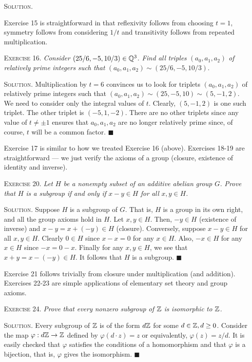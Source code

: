 \documentclass[11pt, leqno]{article}
\newcommand{\done}{\ensuremath{\blacksquare}}
\begin{document}
\textsc{Solution}.

Exercise 15 is straightforward in that reflexivity follows from choosing $t=1$, symmetry follows from considering $1/t$ and transitivity follows from repeated multiplication.

\textsc{Exercise 16}. \emph{Consider $(25/6, -5, 10/3) \in \mathbb{Q}^3$. Find all triples $(a_0,a_1,a_2)$ of relatively prime integers such that $(a_0,a_1,a_2)\sim (25/6, -5, 10/3)$}.

\textsc{Solution}. Multiplication by $t=6$ convinces us to look for triplets $(a_0,a_1,a_2)$ of relatively prime integers such that $(a_0,a_1,a_2)\sim (25, -5, 10)\sim (5, -1, 2)$. We need to consider only the integral values of $t$. Clearly, $(5, -1, 2)$ is one such triplet. The other triplet is $(-5, 1, -2)$. There are no other triplets since any value of $t\ne \pm 1$ ensures that $a_0,a_1,a_2$ are no longer relatively prime since, of course, $t$ will be a common factor. \done

Exercise 17 is similar to how we treated Exercise 16 (above). Exercises 18-19 are straightforward --- we just verify the axioms of a group (closure, existence of identity and inverse).

\textsc{Exercise 20}. \emph{Let $H$ be a nonempty subset of an additive abelian group $G$. Prove that $H$ is a subgroup if and only if $x-y \in H$ for all $x,y\in H$.}

\textsc{Solution}. Suppose $H$ is a subgroup of $G$. That is, $H$ is a group in its own right, and all the group axioms hold in $H$. Let $x,y\in H$. Then, $-y \in H$ (existence of inverse) and $x-y = x+(-y) \in H$ (closure). Conversely, suppose $x-y \in H$ for all $x,y\in H$. Clearly $0 \in H$ since $x-x=0$ for any $x\in H$. Also, $-x \in H$ for any $x\in H$ since $-x = 0-x$. Finally for any $x,y\in H$, we see that $x+y = x-(-y) \in H$. It follows that $H$ is a subgroup. \done

Exercise 21 follows trivially from closure under multiplication (and addition). Exercises 22-23 are simple applications of elementary set theory and group axioms.

\textsc{Exercise 24}. \emph{Prove that every nonzero subgroup of $\mathbb{Z}$ is isomorphic to $\mathbb{Z}$.}

\textsc{Solution}. Every subgroup of $\mathbb{Z}$ is of the form $d\mathbb{Z}$ for some $d\in\mathbb{Z}, d\geq 0$. Consider the map $\varphi: d\mathbb{Z} \to \mathbb{Z}$ defined by $\varphi (d\cdot z) = z$ or equivalently, $\varphi(z) = z/d$. It is easily checked that $\varphi$ satisfies the conditions of a homomorphism and that $\varphi$ is a bijection, that is, $\varphi$ gives the isomorphism. \done
\end{document}
